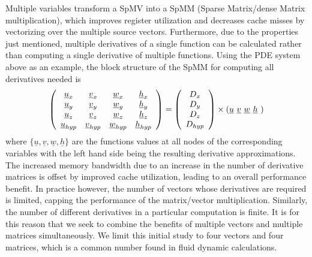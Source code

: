 Multiple variables transform a SpMV into a SpMM (Sparse Matrix/dense Matrix multiplication), which improves register utilization and decreases cache
misses by vectorizing over the multiple source vectors. Furthermore, due to the properties just mentioned, multiple derivatives of a single function can be calculated rather than computing a single derivative of multiple functions. Using the PDE system above as an example, the block structure of the SpMM for computing all derivatives needed is %
\begin{equation}
   \left( \begin{array}{cccc}
    \underline{u}_x     & \underline{v}_x     & \underline{w}_x     & \underline{h}_x \\
    \underline{u}_y     & \underline{v}_y     & \underline{w}_y     & \underline{h}_y \\
    \underline{u}_z     & \underline{v}_z     & \underline{w}_z     & \underline{h}_z \\
    \underline{u}_{hyp} & \underline{v}_{hyp} & \underline{w}_{hyp} & \underline{h}_{hyp}
  \end{array} \right)
  = \left(
  \begin{array}{c}
    D_{x}\\ D_{y}\\ D_{z}\\ D_{hyp}
  \end{array}\right)
  \times \left(\underline{u} \,\, \underline{v} \,\, \underline{w} \,\, \underline{h} \,\,\right) 
  \vspace{-1ex}
  \label{fig:struct_comp}
\end{equation}
where $\{\underline{u},\underline{v}, \underline{w}, \underline{h}\}$ are the functions values at all nodes of the corresponding variables with the left hand side being the resulting derivative approximations. The increased memory bandwidth due to an increase in the number of derivative matrices is offset by improved cache utilization, leading to an overall performance benefit. In practice however, the number of vectors whose derivatives are required is limited, capping the performance of the matrix/vector multiplication. Similarly, the number of different derivatives in a particular computation is finite. It is for this reason that we seek to combine the benefits of multiple vectors and multiple matrices simultaneously. We limit this initial study to four vectors and four matrices, which is a common number found in fluid dynamic calculations.


%
